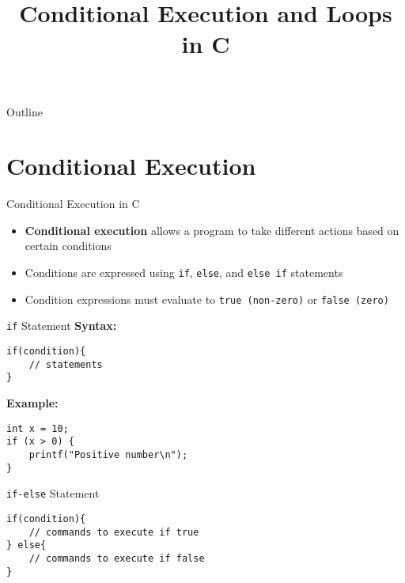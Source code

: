 \documentclass[12pt, aspectratio=169]{beamer}
\title{Conditional Execution and Loops in C}
\author{}
\date{}
\begin{document}
    {
		\addtocounter{framenumber}{-2}    %

		\begin{frame}
			\titlepage
		\end{frame}

		\begin{frame}{Outline}
            \small
			\tableofcontents[subsectionstyle=hide]
		\end{frame}
	}

    \section{Conditional Execution}

    \begin{frame}{Conditional Execution in C}
        \begin{itemize}
            \item \textbf{Conditional execution} allows a program to take different actions based on certain conditions
            \item Conditions are expressed using \texttt{if}, \texttt{else}, and \texttt{else if} statements
            \item Condition expressions must evaluate to \texttt{true (non-zero)} or \texttt{false (zero)}
        \end{itemize}
    \end{frame}


    \begin{frame}[fragile]{\texttt{if} Statement}
        \textbf{Syntax:}
        \begin{verbatim}
if(condition){
    // statements
}
        \end{verbatim}

        \textbf{Example:}
        \begin{verbatim}
int x = 10;
if (x > 0) {
    printf("Positive number\n");
}
        \end{verbatim}

    \end{frame}


    \begin{frame}[fragile]{\texttt{if-else} Statement}
        \begin{verbatim}
if(condition){
    // commands to execute if true
} else{
    // commands to execute if false
}
        \end{verbatim}

    \end{frame}
\end{document}
